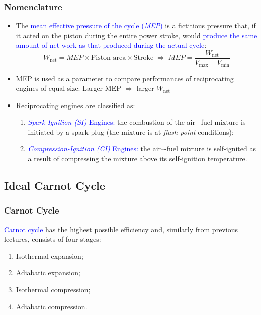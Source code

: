 \documentclass[10pt,compress]{beamer}
\begin{document}
\begin{frame}
 \frametitle{Nomenclature}
   \begin{itemize}
    \item <1-> The \textcolor{blue}{mean effective pressure of the cycle ({\it MEP})} is a fictitious pressure that, if it acted on the piston during the entire power stroke, would \textcolor{blue}{produce the same amount of net work as that produced during the actual cycle}:
        \begin{displaymath}
          W_{\text{net}} =MEP \times \text{Piston area} \times \text{Stroke} \; \Longrightarrow \; MEP= \displaystyle\frac{W_{\text{net}}}{V_{\text{max}}-V_{\text{min}}}
        \end{displaymath}
    \item <2-> MEP is used as a parameter to compare performances of reciprocating engines of equal size:  Larger MEP $\Longrightarrow$ larger $W_{\text{net}}$
    \item <3-> Reciprocating engines are classified as:
     \begin{enumerate}
      \item <4->  \textcolor{blue}{{\it Spark-Ignition (SI)} Engines:} the combustion of the air–-fuel mixture is initiated by a spark plug (the mixture is at {\it flash point} conditions);
      \item <5->  \textcolor{blue}{{\it Compression-Ignition (CI)} Engines:} the air–-fuel mixture is self-ignited as a result of compressing the mixture above its self-ignition temperature.
     \end{enumerate}
   \end{itemize}
\end{frame}



\subsection{Ideal Carnot Cycle}
\begin{frame}
 \frametitle{Carnot Cycle}
  \textcolor{blue}{Carnot cycle} has the highest possible efficiency and, similarly from previous lectures, consists of four stages:
  \begin{enumerate}
   \item <1-> Isothermal expansion; 
   \item <2-> Adiabatic expansion;
   \item <3-> Isothermal compression;
   \item <4-> Adiabatic compression.
  \end{enumerate}
\end{frame}
\end{document}
